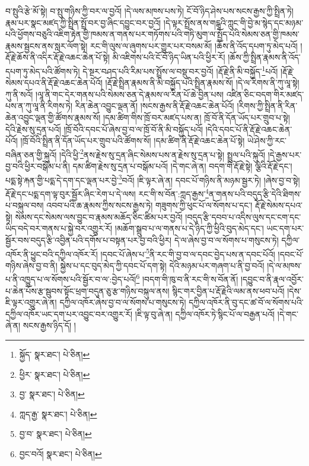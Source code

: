 བ་སྤུའི་རྩེ་མོ་སྟེ། བ་སྤུ་གཉིས་ཀྱི་བར་ལ་བྱའོ། །དེ་ལས་མཁས་པས་ཏེ། ངོ་བོ་ཉིད་ཤེས་པས་སངས་རྒྱས་ཀྱི་སྤྲིན་ཏེ། རྣམ་པར་སྣང་མཛད་ཀྱི་སྤྲིན་སྤྲོ་བར་བྱ་ཞིང་དབྱུང་བར་བྱའོ། །དེ་ལྟར་སྤྲོས་ནས་གངྒཱའི་ཀླུང་གི་བྱེ་མ་སྙེད་དང་མཉམ་པའི་ཕྱོགས་བཅུའི་འཇིག་རྟེན་གྱི་ཁམས་ན་གནས་པར་གཏོགས་པའི་གཏི་མུག་ལ་སྤྱོད་པའི་སེམས་ཅན་གྱི་ཁམས་རྣམས་སྦྱངས་ནས་སླར་ལོག་སྟེ། རང་གི་ལུས་ལ་ཞུགས་པར་གྱུར་པར་བསམ་མོ། །ཆོས་ནི་འོད་དཔག་ཏུ་མེད་པའོ། །རྡོ་རྗེ་ཆོས་ནི་འདིར་རྡོ་རྗེ་འཆང་ཆེན་པོ་སྟེ། མི་འཇིགས་པའི་ངོ་བོ་ཉིད་ཡིན་པའི་ཕྱིར་རོ། །ཆོས་ཀྱི་སྤྲིན་རྣམས་ནི་འོད་དཔག་ཏུ་མེད་པའི་ཚོགས་ཏེ། དེ་སྔར་བཤད་པའི་རིམ་པས་སྤྲོས་ལ་བསྡུ་བར་བྱའོ། །རྡོ་རྗེ་ནི་མི་བསྐྱོད་\footnote{སྐྱོད་  སྣར་ཐང་།  པེ་ཅིན། }པའོ། །རྡོ་རྗེ་སེམས་དཔའ་ནི་རྡོ་རྗེ་འཆང་ཆེན་པོའོ། །རྡོ་རྗེ་སྤྲིན་རྣམས་ནི་མི་བསྐྱོད་པའི་སྤྲིན་རྣམས་སོ། །དེ་ལ་རིགས་ནི་ཀུ་ལཱ་སྟེ། ཀུ་ནི་སའོ། །ལཱ་ནི་གང་དེར་གནས་པའི་སེམས་ཅན་དེ་རྣམས་ལ་རིན་པོ་ཆེ་བྱིན་པས། འཛིན་ཅིང་བདག་གིར་མཛད་པས་ན་ཀུ་ལཱ་ནི་རིགས་ཏེ། རིན་ཆེན་འབྱུང་ལྡན་ནོ། །སངས་རྒྱས་ནི་རྡོ་རྗེ་འཆང་ཆེན་པོའོ། །རིགས་ཀྱི་སྤྲིན་ནི་རིན་ཆེན་འབྱུང་ལྡན་གྱི་ཚོགས་རྣམས་སོ། །དམ་ཚིག་གིས་ཁྲོ་བར་མཛད་པས་ན། ཁྲོ་བོ་ནི་དོན་ཡོད་པར་གྲུབ་པ་སྟེ། དེའི་རྗེས་སུ་དྲན་པའོ། །ཁྲོ་བོའི་དབང་པོ་ཞེས་བྱ་བ་ལ་ཁྲོ་བོ་ནི་མི་བསྐྱོད་པའོ། །དེའི་དབང་པོ་ནི་རྡོ་རྗེ་འཆང་ཆེན་པོའོ། །ཁྲོ་བོའི་སྤྲིན་ནི་དོན་ཡོད་པར་གྲུབ་པའི་ཚོགས་སོ། །དམ་ཚིག་ནི་རྡོ་རྗེ་འཆང་ཆེན་པོ་སྟེ། ཡེ་ཤེས་ཀྱི་རང་བཞིན་ཅན་གྱི་སྐུའོ། །དེའི་ཕྱི་\footnote{ཕྱིར་  སྣར་ཐང་།  པེ་ཅིན། }ནས་རྗེས་སུ་དྲན་ཞིང་སེམས་པས་ན་རྗེས་སུ་དྲན་པ་སྟེ། སྤྲུལ་པའི་སྐུའོ། །དེ་རྒྱས་པར་བྱ་བའི་ཕྱིར་བསྒོམ་པ་ནི། དམ་ཚིག་རྗེས་སུ་དྲན་པ་བསྒོམ་པའོ། །དེ་གང་ཞེ་ན། བདག་གི་རྡོ་རྗེ་སྟེ། ལྕེའི་རྡོ་རྗེ་དང་། པདྨ་སྟེ་རྐན་གྱི་པདྨ་དེ་དག་དང་ལྡན་པར་བྱེ་\footnote{བྱ་  སྣར་ཐང་།  པེ་ཅིན། }བའོ། །ཇི་ལྟར་ཞེ་ན། དབང་པོ་གཉིས་ནི་མཉམ་སྦྱར་ཏེ། །ཞེས་བྱ་བ་སྟེ། རྡོ་རྗེ་དང་པདྨ་དག་ལྟ་བུར་སྦྱོར་ཞིང་རེག་པ་དེ་ལས། རང་གི་ས་བོན་:ཀླད་རྒྱས་\footnote{ཀླད་རྒྱ་  སྣར་ཐང་།  པེ་ཅིན། }ན་གནས་པའི་བདུད་རྩི་དེའི་ཐིགས་པ་བསྐུལ་བས། འབབ་པའི་ཆ་རྣམས་ཀྱིས་སངས་རྒྱས་ཏེ། གཟུགས་ཀྱི་ཕུང་པོ་ལ་སོགས་པ་དང་། རྡོ་རྗེ་སེམས་དཔའ་སྟེ། སེམས་དང་སེམས་ལས་བྱུང་བ་རྣམས་མཆོད་ཅིང་ཚིམ་པར་བྱའོ། །བདུད་རྩི་དབབ་པ་འདིས་ལུས་དང་ངག་དང་ཡིད་བདེ་བར་གནས་པ་སྐྱེ་བར་འགྱུར་རོ། །མཆོག་སྒྲུབ་པ་ལ་གནས་པ་དེ་ཉིད་ཀྱི་ཕྱིའི་བུད་མེད་དང་། ཡང་དག་པར་སྦྱོར་བས་བདུད་རྩི་འབྱིན་པའི་དགོས་པ་བསྟན་པར་བྱ་བའི་ཕྱིར། དེ་ལ་ཞེས་བྱ་བ་ལ་སོགས་པ་གསུངས་ཏེ། དཀྱིལ་འཁོར་ནི་ཕྱུང་བའི་དཀྱིལ་འཁོར་རོ། །དབང་པོ་ཞེས་པ་\footnote{བྱ་བ་  སྣར་ཐང་།  པེ་ཅིན། }ནི་རང་གི་བྱ་བ་ལ་དབང་བྱེད་པས་ན་དབང་པོའོ། །དབང་པོ་གཉིས་ཞེས་བྱ་བ་ནི། སྐྱེས་པ་དང་བུད་མེད་ཀྱི་དབང་པོ་དག་སྟེ། དེའི་མཉམ་པར་གཞག་པ་ནི་བྱ་བའོ། །དེ་ལ་མཁས་པ་ནི་འཁྱུད་པ་ལ་སོགས་པའི་སྦྱོར་བ་ལ་:བྱེད་པའོ།\footnote{བྱང་བའོ།  སྣར་ཐང་།  པེ་ཅིན། } །བདག་གི་ཁུ་བ་ནི་རང་གི་ས་བོན་ནོ། །དབྱུང་བ་ནི་རྣལ་འབྱོར་པ་ཆེན་པོས་རྩ་སྦུབས་སྟོང་ཕྲག་བདུན་ཅུ་རྩ་གཉིས་བསྐུལ་ནས། སྙིང་གར་བྱིན་པ་རྡོ་རྗེའི་ལམ་ནས་ཕབ་པའོ། །དེས་ཇི་ལྟར་འགྱུར་ཞེ་ན། དཀྱིལ་འཁོར་ཞེས་བྱ་བ་ལ་སོགས་པ་གསུངས་ཏེ། དཀྱིལ་འཁོར་ནི་བུ་དང་ཚ་བོ་ལ་སོགས་པའི་དཀྱིལ་འཁོར་ཡང་དག་པར་འབྱུང་བར་འགྱུར་རོ། །ཇི་ལྟ་བུ་ཞེ་ན། དཀྱིལ་འཁོར་ཏེ་སྙིང་པོ་ལ་བརྒྱན་པའོ། །དེ་གང་ཞེ་ན། སངས་རྒྱས་ཉིད་དོ། །
